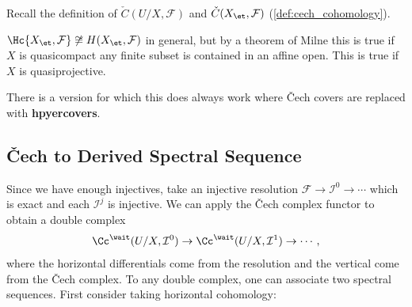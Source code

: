 Recall the definition of \(\check{C}(U/X, \mathcal{F})\) and
\(\check{C}(X_\et, \mathcal{F})\) (\cref{def:cech_cohomology}).

\begin{warnings}

\(\Hc{X_\et, \mathcal{F}} \not\cong H(X_\et, \mathcal{F})\) in general,
but by a theorem of Milne this is true if \(X\) is quasicompact any
finite subset is contained in an affine open. This is true if \(X\) is
quasiprojective.

\end{warnings}

\begin{remark}

There is a version for which this does always work where Čech covers are
replaced with \textbf{hpyercovers}.

\end{remark}

\hypertarget{ux10dech-to-derived-spectral-sequence}{%
\subsection{Čech to Derived Spectral
Sequence}\label{ux10dech-to-derived-spectral-sequence}}

Since we have enough injectives, take an injective resolution
\(\mathcal{F}\to \mathcal{I}^0 \to \cdots\) which is exact and each
\(\mathcal{I}^j\) is injective. We can apply the Čech complex functor to
obtain a double complex
\begin{align*}
\Cc^\wait(U/X, \mathcal{I}^0) \to \Cc^\wait(U/X, \mathcal{I}^1) \to \cdots
,\end{align*} where the horizontal differentials come from the
resolution and the vertical come from the Čech complex. To any double
complex, one can associate two spectral sequences. First consider taking
horizontal cohomology:

\begin{center}
\end{center}

